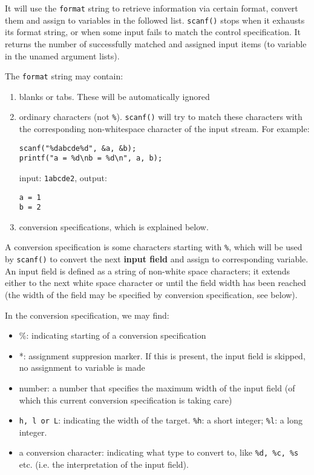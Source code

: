 \documentclass[12pt]{article}
\begin{document}
It will use the \texttt{format} string to retrieve information via certain format, convert them and assign to variables in the followed list. \texttt{scanf()} stops when it exhausts its format string, or when some input fails to match the control specification. It returns the number of successfully matched and assigned input items (to variable in the unamed argument lists).

The \texttt{format} string may contain:
\begin{enumerate}
\item blanks or tabs. These will be automatically ignored
\item ordinary characters (not \texttt{\%}). \texttt{scanf()} will try to match these characters with the corresponding non-whitespace character of the input stream. For example:
\begin{verbatim}
scanf("%dabcde%d", &a, &b);
printf("a = %d\nb = %d\n", a, b);
\end{verbatim}
input: \texttt{1abcde2}, output:
\begin{verbatim}
a = 1
b = 2
\end{verbatim}
\item conversion specifications, which is explained below.
\end{enumerate}

A conversion specification is some characters starting with \texttt{\%}, which will be used by \texttt{scanf()} to convert the next \textbf{input field} and assign to corresponding variable. An input field is defined as a string of non-white space characters; it extends either to the next white space character or until the field width has been reached (the width of the field may be specified by conversion specification, see below).

In the conversion specification, we may find:
\begin{itemize}
\item \%: indicating starting of a conversion specification
\item *: assignment suppresion marker. If this is present, the input field is skipped, no assignment to variable is made
\item number: a number that specifies the maximum width of the input field (of which this current conversion specification is taking care)
\item \texttt{h, l or L}: indicating the width of the target. \texttt{\%h}: a short integer; \texttt{\%l}: a long integer.
\item a conversion character: indicating what type to convert to, like \texttt{\%d, \%c, \%s} etc. (i.e. the interpretation of the input field).
\end{itemize}
\end{document}

